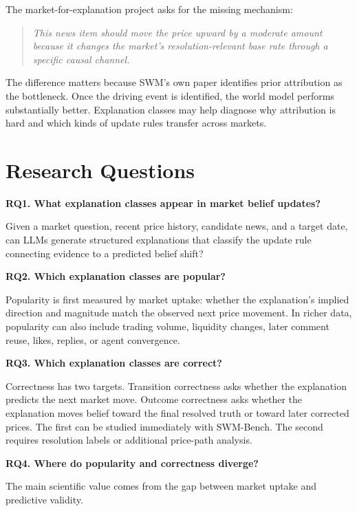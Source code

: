 \documentclass[11pt]{article}
\begin{document}
The market-for-explanation project asks for the missing mechanism:

\begin{quote}
\textit{This news item should move the price upward by a moderate amount because it changes the market's resolution-relevant base rate through a specific causal channel.}
\end{quote}

The difference matters because SWM's own paper identifies prior attribution as the bottleneck. Once the driving event is identified, the world model performs substantially better. Explanation classes may help diagnose why attribution is hard and which kinds of update rules transfer across markets.

\section{Research Questions}
\textbf{RQ1. What explanation classes appear in market belief updates?}

Given a market question, recent price history, candidate news, and a target date, can LLMs generate structured explanations that classify the update rule connecting evidence to a predicted belief shift?

\textbf{RQ2. Which explanation classes are popular?}

Popularity is first measured by market uptake: whether the explanation's implied direction and magnitude match the observed next price movement. In richer data, popularity can also include trading volume, liquidity changes, later comment reuse, likes, replies, or agent convergence.

\textbf{RQ3. Which explanation classes are correct?}

Correctness has two targets. Transition correctness asks whether the explanation predicts the next market move. Outcome correctness asks whether the explanation moves belief toward the final resolved truth or toward later corrected prices. The first can be studied immediately with SWM-Bench. The second requires resolution labels or additional price-path analysis.

\textbf{RQ4. Where do popularity and correctness diverge?}

The main scientific value comes from the gap between market uptake and predictive validity.
\end{document}
